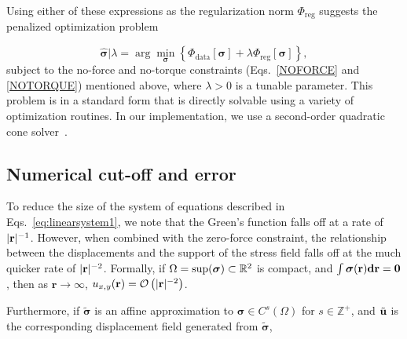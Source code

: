 \documentclass[aps,prl,reprint,twocolumn,groupedaddress,showpacs]{revtex4-1}
\DeclarePairedDelimiter{\norm}{\lVert}{\rVert}
\newcommand{\bsigma}{{\boldsymbol\sigma}}
\def\d{{\bf d}}
\def\r{{\bf r}}
\def\u{{\bf u}}
\begin{document}
Using either of these expressions as the regularization norm
$\Phi_{\textrm{reg}}$ suggests the penalized optimization problem

\begin{equation}
\hat{\bsigma} \big\vert \lambda = \arg\min_{\bsigma} \left\{ \Phi_{\textrm{data}}[\bsigma] + 
\lambda\Phi_{\textrm{reg}}[\bsigma] \right\},
\label{eq:objective}
\end{equation}
%
subject to the no-force and no-torque constraints (Eqs.~\ref{NOFORCE}
and \ref{NOTORQUE}) mentioned above, where $\lambda>0$ is a tunable
parameter. This problem is in a standard form that is directly
solvable using a variety of optimization routines.  In our
implementation, we use a second-order quadratic cone solver~\cite{cvxpy}.

\subsection{Numerical cut-off and error}
To reduce the size of the system of equations described in
Eqs.~\ref{eq:linearsystem1}, we note that the Green's function falls
off at a rate of $|\r|^{-1}$. However, when combined with the
zero-force constraint, the relationship between the
displacements and the support of the stress field falls off at the
much quicker rate of $|\r|^{-2}$. Formally, if 
%
%
$\Omega = {\rm sup}(\bsigma)\subset \mathbb{R}^2$ is compact, and
 $\int \bsigma(\r)\d\r = \mathbf{0}$, then
as $\mathbf{r}\to\infty$, $u_{x,y}(\r) = \mathcal{O}\left( |\r|^{-2} \right)$.


Furthermore, if $\tilde{\bsigma}$ is an affine approximation to
$\bsigma\in C^s(\Omega)$ for $s\in\mathbb{Z}^+$, and $\tilde{\u}$ is
the corresponding displacement field generated from $\tilde{\bsigma}$,
\end{document}
